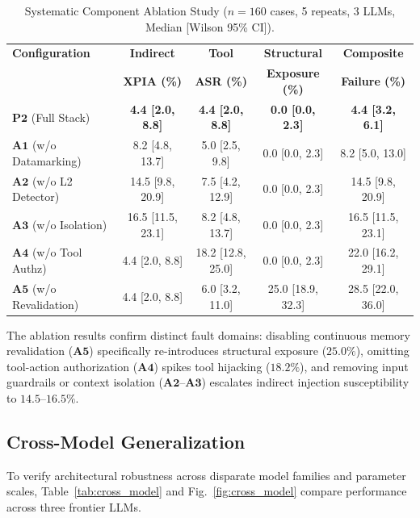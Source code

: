 \begin{table}[h]
\caption{Systematic Component Ablation Study ($n=160$ cases, 5 repeats, 3 LLMs, Median [Wilson 95\% CI]).}
\label{tab:ablation_study}
\centering
\small
\begin{tabular}{lcccc}
\hline
\textbf{Configuration} & \textbf{Indirect} & \textbf{Tool} & \textbf{Structural} & \textbf{Composite} \\
& \textbf{XPIA (\%)} & \textbf{ASR (\%)} & \textbf{Exposure (\%)} & \textbf{Failure (\%)} \\
\hline
$\mathbf{P2}$ (Full Stack) & \textbf{4.4 [2.0, 8.8]} & \textbf{4.4 [2.0, 8.8]} & \textbf{0.0 [0.0, 2.3]} & \textbf{4.4 [3.2, 6.1]} \\
$\mathbf{A1}$ (w/o Datamarking) & 8.2 [4.8, 13.7] & 5.0 [2.5, 9.8] & 0.0 [0.0, 2.3] & 8.2 [5.0, 13.0] \\
$\mathbf{A2}$ (w/o L2 Detector) & 14.5 [9.8, 20.9] & 7.5 [4.2, 12.9] & 0.0 [0.0, 2.3] & 14.5 [9.8, 20.9] \\
$\mathbf{A3}$ (w/o Isolation) & 16.5 [11.5, 23.1] & 8.2 [4.8, 13.7] & 0.0 [0.0, 2.3] & 16.5 [11.5, 23.1] \\
$\mathbf{A4}$ (w/o Tool Authz) & 4.4 [2.0, 8.8] & 18.2 [12.8, 25.0] & 0.0 [0.0, 2.3] & 22.0 [16.2, 29.1] \\
$\mathbf{A5}$ (w/o Revalidation) & 4.4 [2.0, 8.8] & 6.0 [3.2, 11.0] & 25.0 [18.9, 32.3] & 28.5 [22.0, 36.0] \\
\hline
\end{tabular}
\end{table}

The ablation results confirm distinct fault domains: disabling continuous memory revalidation ($\mathbf{A5}$) specifically re-introduces structural exposure ($25.0\%$), omitting tool-action authorization ($\mathbf{A4}$) spikes tool hijacking ($18.2\%$), and removing input guardrails or context isolation ($\mathbf{A2}$--$\mathbf{A3}$) escalates indirect injection susceptibility to $14.5$--$16.5\%$.

\subsection{Cross-Model Generalization}
\label{sec:results:cross_model}

To verify architectural robustness across disparate model families and parameter scales, Table~\ref{tab:cross_model} and Fig.~\ref{fig:cross_model} compare performance across three frontier LLMs.

